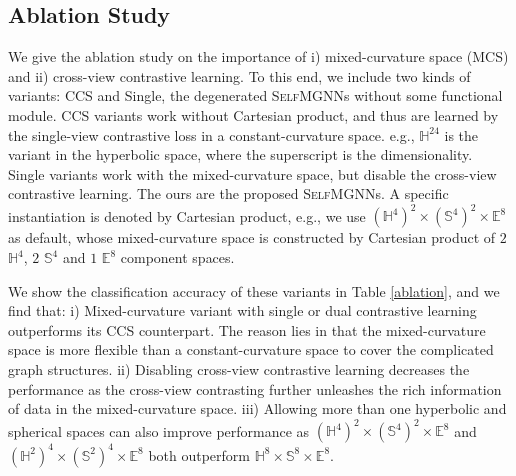 \subsection{Ablation Study} 
We give the ablation study on the importance of i)  mixed-curvature space (MCS) and 
ii) cross-view contrastive learning.
To this end, we include two kinds of variants: CCS and Single, the degenerated \textsc{SelfMGNN}s without some functional module.
CCS variants work without Cartesian product, and thus are learned by the single-view contrastive loss in a constant-curvature space. 
e.g., $\mathbb H^{24}$ is the variant in the hyperbolic space, where the superscript is the dimensionality.
Single variants work with the mixed-curvature space, but disable the cross-view contrastive learning.
The ours are the proposed \textsc{SelfMGNN}s.
A specific instantiation is denoted by Cartesian product, e.g., 
we use $(\mathbb H^4)^2\times(\mathbb S^4)^2\times\mathbb E^8$ as default, 
whose mixed-curvature space is constructed by Cartesian product of  $2$ $\mathbb H^4$,  $2$ $\mathbb S^4$ and $1$ $\mathbb E^8$ component spaces. 

We show the classification accuracy of these variants in Table \ref{ablation}, and we find that:
i) Mixed-curvature variant with single or dual contrastive learning outperforms its CCS counterpart. The reason lies in that the mixed-curvature space is more flexible than a constant-curvature space to cover the complicated graph structures.
ii) Disabling cross-view contrastive learning decreases the performance as the cross-view contrasting further unleashes the rich information of data in the mixed-curvature space. 
iii) Allowing  more than one hyperbolic and spherical spaces can also improve performance as $(\mathbb H^4)^2\times (\mathbb S^4)^2\times\mathbb E^8$
and  $(\mathbb H^2)^4\times (\mathbb S^2)^4\times\mathbb E^8$ both outperform $\mathbb H^8 \times\mathbb S^8\times\mathbb E^8$.


